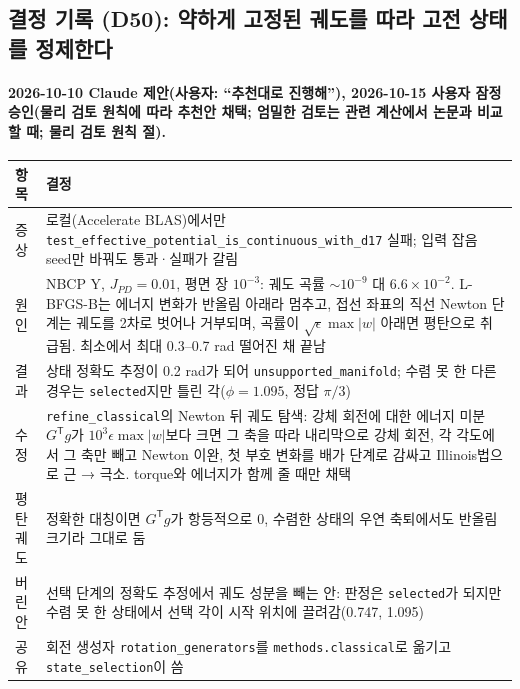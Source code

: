 \endgroup


\subsection{결정 기록 (D50): 약하게 고정된 궤도를 따라 고전 상태를 정제한다}\label{decisions-d50-orbit-refinement}
\begingroup%
  \framesubtitle{2026-10-10 Claude 제안(사용자: ``추천대로 진행해''), 2026-10-15 사용자 잠정 승인(물리 검토 원칙에 따라 추천안 채택; 엄밀한 검토는 관련 계산에서 논문과 비교할 때; 물리 검토 원칙 절).}
  \small\renewcommand{\arraystretch}{1.12}
  \begin{tabularx}{\textwidth}{@{}P{3.0cm}Y@{}}
    \toprule
    항목 & 결정 \\
    \midrule
    증상 & 로컬(Accelerate BLAS)에서만 \texttt{test\_effective\_potential\_is\_continuous\_with\_d17} 실패; 입력 잡음 seed만 바꿔도 통과·실패가 갈림 \\
    원인 & NBCP Y, $J_{PD}=0.01$, 평면 장 $10^{-3}$: 궤도 곡률 $\sim10^{-9}$ 대 $6.6\times10^{-2}$. L-BFGS-B는 에너지 변화가 반올림 아래라 멈추고, 접선 좌표의 직선 Newton 단계는 궤도를 2차로 벗어나 거부되며, 곡률이 $\sqrt{\epsilon}\max|w|$ 아래면 평탄으로 취급됨. 최소에서 최대 0.3--0.7 rad 떨어진 채 끝남 \\
    결과 & 상태 정확도 추정이 0.2 rad가 되어 \texttt{unsupported\_manifold}; 수렴 못 한 다른 경우는 \texttt{selected}지만 틀린 각($\phi=1.095$, 정답 $\pi/3$) \\
    수정 & \texttt{refine\_classical}의 Newton 뒤 궤도 탐색: 강체 회전에 대한 에너지 미분 $G^{\mathsf T}g$가 $10^3\epsilon\max|w|$보다 크면 그 축을 따라 내리막으로 강체 회전, 각 각도에서 그 축만 빼고 Newton 이완, 첫 부호 변화를 배가 단계로 감싸고 Illinois법으로 근 → 극소. torque와 에너지가 함께 줄 때만 채택 \\
    평탄 궤도 & 정확한 대칭이면 $G^{\mathsf T}g$가 항등적으로 0, 수렴한 상태의 우연 축퇴에서도 반올림 크기라 그대로 둠 \\
    버린 안 & 선택 단계의 정확도 추정에서 궤도 성분을 빼는 안: 판정은 \texttt{selected}가 되지만 수렴 못 한 상태에서 선택 각이 시작 위치에 끌려감(0.747, 1.095) \\
    공유 & 회전 생성자 \texttt{rotation\_generators}를 \texttt{methods.classical}로 옮기고 \texttt{state\_selection}이 씀 \\
    \bottomrule
  \end{tabularx}
\endgroup


